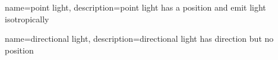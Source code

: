 {
  name=point light,
  description={point light has a position and emit light isotropically}
}

{
  name=directional light,
  description={directional light has direction but no position}
}
